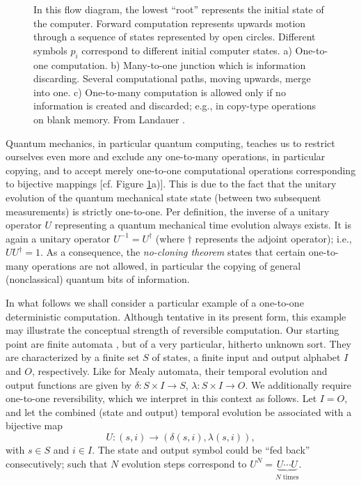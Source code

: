 \documentclass[pra,amsfonts,twocolumn]{revtex4}
\begin{document}
\begin{figure}
\begin{center}
\begin{picture}
\end{picture}
\end{center}
\caption{In this flow diagram, the lowest ``root'' represents the
initial state of the computer. Forward computation represents
upwards motion
through a sequence of states represented by open circles. Different
symbols $p_i$ correspond to different initial computer states.
a) One-to-one computation.
b) Many-to-one junction which is information discarding. Several
computational paths, moving upwards, merge into one.
c) One-to-many computation is allowed only
 if no information is
created and discarded; e.g., in copy-type operations on blank memory.
From Landauer \protect\cite{landauer-94}.
\label{f-rev-comp}
}
\end{figure}

Quantum mechanics, in particular quantum computing, teaches us to
restrict ourselves even more and exclude any one-to-many operations, in
particular copying, and to accept merely one-to-one
computational operations
corresponding to bijective mappings [cf.
Figure \ref{f-rev-comp}a)].
This is due to the fact that the unitary
evolution of the quantum mechanical state state (between two subsequent
measurements) is strictly one-to-one.
Per definition, the inverse of a unitary operator $U$ representing a
quantum mechanical time evolution always exists. It is again a unitary
operator $U^{-1}=U^\dagger$ (where $\dagger$ represents the adjoint
operator); i.e., $UU^\dagger =1$.
As a consequence, the {\em no-cloning theorem}
\cite{herbert,wo-zu,mandel:83,mil-hard,glauber,caves}
states that certain one-to-many
operations are not allowed, in particular the copying of general
(nonclassical)
quantum bits of information.

In what follows we shall consider a particular example of a
one-to-one deterministic computation.  Although tentative in its present
form, this example may illustrate the conceptual strength of reversible
computation.  Our starting point are
finite automata \cite{e-f-moore,conway,brauer-84,schaller-96,cal-sv-yu},
but of a very particular,
hitherto unknown sort.  They are characterized by a finite set $S$ of
states, a finite input and output alphabet $I$ and $O$, respectively.
Like for Mealy automata, their temporal evolution and output functions
are given by $\delta :S\times I\rightarrow S$, $\lambda :S\times
I\rightarrow O$.  We additionally require one-to-one reversibility,
which we interpret in this context as follows.  Let $I=O$, and let the
combined (state and output) temporal evolution be associated with a
bijective map
\begin{equation}
U:(s,i)\rightarrow (\delta(s,i),\lambda (s,i)),
\label{t-e-l}
\end{equation}
with
$s\in S$ and $i\in I$.
The state and output symbol could be ``fed back'' consecutively; such
that
$N$ evolution steps correspond to $U^N=\underbrace{U\cdots U}_{N
\;\textrm{times}}$.
\end{document}
